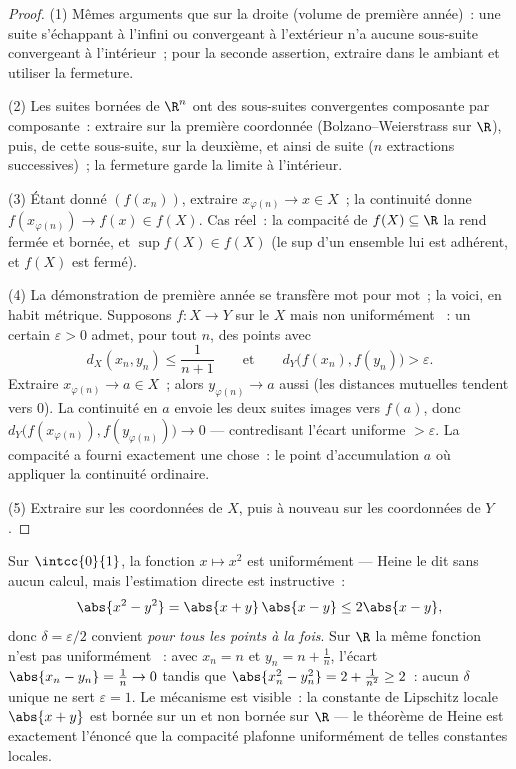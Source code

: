 \begin{proof}
(1) Mêmes arguments que sur la droite (volume de première année)~:
une suite s'échappant à l'infini ou convergeant à l'extérieur n'a
aucune sous-suite convergeant à l'intérieur~; pour la seconde
assertion, extraire dans le  ambiant et utiliser la fermeture.

(2) Les suites bornées de $\R^n$ ont des sous-suites convergentes
composante par composante~: extraire sur la première coordonnée
(Bolzano--Weierstrass sur $\R$), puis, de cette sous-suite, sur la
deuxième, et ainsi de suite ($n$ extractions successives)~; la
fermeture garde la limite à l'intérieur.

(3) Étant donné $(f(x_n))$, extraire $x_{\varphi(n)} \to x \in X$~;
la continuité donne $f(x_{\varphi(n)}) \to f(x) \in f(X)$. Cas réel~:
la compacité de $f(X) \subseteq \R$ la rend fermée et bornée, et
$\sup f(X) \in f(X)$ (le sup d'un ensemble lui est adhérent, et
$f(X)$ est fermé).

(4) La démonstration de première année se transfère mot pour mot~;
la voici, en habit métrique. Supposons $f \colon X \to Y$ 
sur le  $X$ mais non uniformément ~: un certain
$\varepsilon > 0$ admet, pour tout $n$, des points avec
\[
d_X(x_n, y_n) \leq \frac{1}{n+1}
\qquad\text{et}\qquad
d_Y\bigl(f(x_n), f(y_n)\bigr) > \varepsilon .
\]
Extraire $x_{\varphi(n)} \to a \in X$~; alors $y_{\varphi(n)} \to a$
aussi (les distances mutuelles tendent vers $0$). La continuité en
$a$ envoie les deux suites images vers $f(a)$, donc
$d_Y\bigl(f(x_{\varphi(n)}), f(y_{\varphi(n)})\bigr) \to 0$ ---
contredisant l'écart uniforme $> \varepsilon$. La compacité a fourni
exactement une chose~: le point d'accumulation $a$ où appliquer la
continuité ordinaire.

(5) Extraire sur les coordonnées de $X$, puis à nouveau sur les
coordonnées de $Y$.
\end{proof}

\begin{example}\label{ex:b2:metric:heinework}
Sur $\intcc{0}{1}$, la fonction $x \mapsto x^2$ est uniformément
 --- Heine le dit sans aucun calcul, mais l'estimation
directe est instructive~:
\[
\abs{x^2 - y^2} = \abs{x + y}\,\abs{x - y} \leq 2\abs{x - y},
\]
donc $\delta = \varepsilon/2$ convient \emph{pour tous les points à
la fois}. Sur $\R$ la même fonction n'est pas uniformément ~:
avec $x_n = n$ et $y_n = n + \frac1n$, l'écart $\abs{x_n - y_n} =
\frac1n \to 0$ tandis que $\abs{x_n^2 - y_n^2} = 2 + \frac1{n^2} \geq
2$~: aucun $\delta$ unique ne sert $\varepsilon = 1$. Le mécanisme
est visible~: la constante de Lipschitz locale $\abs{x + y}$ est
bornée sur un  et non bornée sur $\R$ --- le théorème de Heine
est exactement l'énoncé que la compacité plafonne uniformément de
telles constantes locales.
\end{example}

